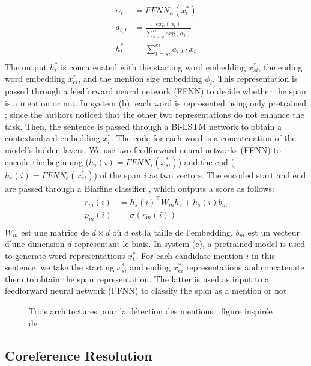 \documentclass{KBook}
\begin{document}
\begin{align*}
\alpha_t & = FFNN_\alpha(x_t^*) \\
a_{i, t} & = \frac{exp(\alpha_t)}{\sum_{k=si}^{ei} exp(\alpha_k)} \\
h_i^* & = \sum_{t=si}^{ei} a_{i, t} \cdot x_t \\
\end{align*}
The output $h^*_i$ is concatenated with the starting word embedding $x^*_{si}$, the ending word embedding $x^*_{ei}$, and the mention size embedding $\phi_i$. 
This representation is passed through a feedforward neural network (FFNN) to decide whether the span is a mention or not.
In system (b), each word is represented using only pretrained ; since the authors noticed that the other two representations do not enhance the task. 
Then, the sentence is passed through a Bi-LSTM network to obtain a contextualized embedding $x_i^*$. 
The code for each word is a concatenation of the model's hidden layers. 
We use two feedforward neural networks (FFNN) to encode the beginning ($ h_s(i) = FFNN_s(x_{si}^*)$) and the end ($ h_e(i) = FFNN_e(x_{ei}^*)$) of the span $i$ as two vectors. 
The encoded start and end are passed through a Biaffine classifier \cite{2017-dozat-manning}, which outputs a score as follows:
\begin{align*}
r_m(i) & = h_s(i)^\top W_m h_e + h_s(i) b_m \\
p_m(i) & = \sigma(r_m(i)) \\
\end{align*}
$W_m$ est une matrice de $d\times d$ où $d$ est la taille de l'embedding.
$b_m$ est un vecteur d'une dimension $d$ représentant le biais.
In system (c), a pretrained  model is used to generate word representations $x^*_t$. 
For each candidate mention $i$ in this sentence, we take the starting $x^*_{si}$ and ending $x^*_{ei}$ representations and concatenate them to obtain the span representation. 
The latter is used as input to a feedforward neural network (FFNN) to classify the span as a mention or not.

\begin{figure}[ht]
	\centering
	\caption[Trois architectures pour la détection des mentions]{Trois architectures pour la détection des mentions ; figure inspirée de \cite{2020-yu-al}}
	\label{fig:det-mention-yu}
\end{figure}

\subsection{Coreference Resolution}
\end{document}
